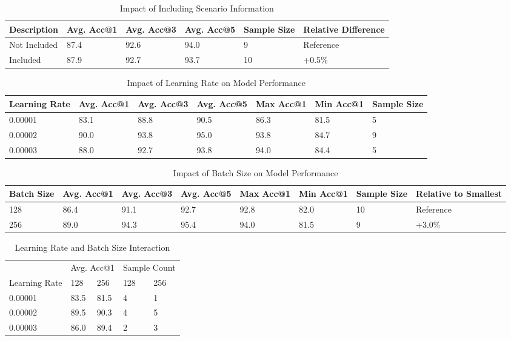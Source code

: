 \begin{table}[htbp]
\centering
\caption{Impact of Including Scenario Information}
\label{tab:scenario_info_impact}
\begin{tabularx}{\textwidth}{lXXXXX}
\toprule
Description & Avg. Acc@1 & Avg. Acc@3 & Avg. Acc@5 & Sample Size & Relative Difference \\
\midrule
Not Included & 87.4 & 92.6 & 94.0 & 9 & Reference \\
Included & 87.9 & 92.7 & 93.7 & 10 & +0.5\% \\
\bottomrule
\end{tabularx}
\end{table}

\begin{table}[htbp]
\centering
\caption{Impact of Learning Rate on Model Performance}
\label{tab:learning_rate_impact}
\begin{tabularx}{\textwidth}{XXXXXXX}
\toprule
Learning Rate & Avg. Acc@1 & Avg. Acc@3 & Avg. Acc@5 & Max Acc@1 & Min Acc@1 & Sample Size \\
\midrule
0.00001 & 83.1 & 88.8 & 90.5 & 86.3 & 81.5 & 5 \\
0.00002 & 90.0 & 93.8 & 95.0 & 93.8 & 84.7 & 9 \\
0.00003 & 88.0 & 92.7 & 93.8 & 94.0 & 84.4 & 5 \\
\bottomrule
\end{tabularx}
\end{table}

\begin{table}[htbp]
\centering
\caption{Impact of Batch Size on Model Performance}
\label{tab:batch_size_impact}
\begin{tabularx}{\textwidth}{XXXXXXXX}
\toprule
Batch Size & Avg. Acc@1 & Avg. Acc@3 & Avg. Acc@5 & Max Acc@1 & Min Acc@1 & Sample Size & Relative to Smallest \\
\midrule
128 & 86.4 & 91.1 & 92.7 & 92.8 & 82.0 & 10 & Reference \\
256 & 89.0 & 94.3 & 95.4 & 94.0 & 81.5 & 9 & +3.0\% \\
\bottomrule
\end{tabularx}
\end{table}

\begin{table}[htbp]
\centering
\caption{Learning Rate and Batch Size Interaction}
\label{tab:lr_bs_interaction}
\begin{tabularx}{\textwidth}{XXXXX}
\toprule
 & \multicolumn{2}{c}{Avg. Acc@1} & \multicolumn{2}{c}{Sample Count} \\
\cmidrule(lr){2-3} \cmidrule(lr){4-5}
Learning Rate & 128 & 256 & 128 & 256 \\
\midrule
0.00001 & 83.5 & 81.5 & 4 & 1 \\
0.00002 & 89.5 & 90.3 & 4 & 5 \\
0.00003 & 86.0 & 89.4 & 2 & 3 \\
\bottomrule
\end{tabularx}
\end{table}

